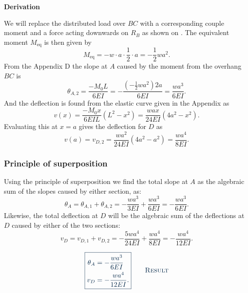 \documentclass[a4paper]{article}
\numberwithin{equation}{problem}
\newcommand{\AUheading}[1]{%
  \par\vspace{.4\baselineskip}%
  {\sffamily\bfseries\color{AUblueDark}#1\par}%
  \nobreak%
}
\newenvironment{derivation}[1][Derivation]{%
  \AUheading{#1}
  \begingroup\allowdisplaybreaks
  \setlength{\abovedisplayskip}{6pt}%
  \setlength{\belowdisplayskip}{6pt}%
  \setlength{\abovedisplayshortskip}{4pt}%
  \setlength{\belowdisplayshortskip}{4pt}%
}{\par\endgroup\medskip}
\newcommand{\finalresult}[1]{%
  \vspace{.2\baselineskip}%
  \begin{equation}
    {\color{AUblueDark}\boxed{\displaystyle #1}}
    \tag*{\textsc{\textcolor{AUblueDark}{Result}}}
  \end{equation}
  \newpage
}
\begin{document}
\begin{derivation}
  We will replace the distributed load over $BC$ with a corresponding couple moment and a force acting downwards on $R_B$ as shown on .
  The equivalent moment $M_{\mathrm{eq}}$ is then given by
  \begin{equation*}
    M_{\mathrm{eq}} = - w \cdot a \cdot \frac{1}{2} \cdot a = - \frac{1}{2} w a^2
  .\end{equation*}
  From the Appendix D the slope at $A$ caused by the moment from the overhang $BC$ is
  \begin{equation*}
    \theta_{A,2} = \frac{- M_0 L}{6 EI} = - \frac{\left( - \frac{1}{2}w a^2 \right) 2a}{6 EI} = \frac{w a^3}{6 EI}
  .\end{equation*}
  And the deflection is found from the elastic curve given in the Appendix as
  \begin{equation*}
    v(x) = \frac{- M_0 x}{6 EIL} \left( L^2 - x^2 \right) = \frac{wax}{24 EI} \left( 4a^2 - x^2 \right)
  .\end{equation*}
  Evaluating this at $x = a$ gives the deflection for $D$ as
  \begin{equation*}
    v(a) = v_{D,2} = \frac{w a^2}{24 EI} \left( 4a^2 - a^2 \right) = \frac{wa^{4}}{8 EI}
  .\end{equation*}
  
  \subsubsection*{Principle of superposition}
  Using the principle of superposition we find the total slope at $A$ as the algebraic sum of the slopes caused by either section, as:
  \begin{equation*}
    \theta_A = \theta_{A,1} + \theta_{A,2} = -\frac{w a^3}{3 EI} + \frac{wa^3}{6EI} = - \frac{wa^3}{6EI}
  .\end{equation*}
  Likewise, the total deflection at $D$ will be the algebraic sum of the deflections at $D$ caused by either of the two sections:
  \begin{equation*}
    v_{D} = v_{D,1} + v_{D,2} = - \frac{5 w a^{4}}{24 EI} + \frac{wa^{4}}{8 EI} = - \frac{wa^{4}}{12EI}
  .\end{equation*}
\end{derivation}

\finalresult{
\begin{aligned}
  \theta_A &= - \frac{wa^3}{6 EI} \\
  v_D &= - \frac{wa^{4}}{12 EI}
.\end{aligned}
}
\end{document}
